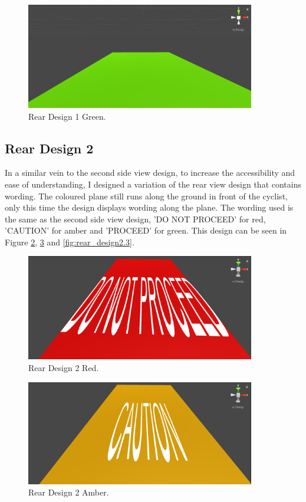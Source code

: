 \documentclass{l4proj}
\begin{document}
\begin{figure}[H]
    \centering
    \includegraphics[width=10cm]{images/rear_design1.3.png}
    \caption{Rear Design 1 Green.}
    \label{fig:rear_design1.3}
\end{figure}

\subsection{Rear Design 2}

In a similar vein to the second side view design, to increase the accessibility and ease of understanding, I designed a variation of the rear view design that contains wording. The coloured plane still runs along the ground in front of the cyclist, only this time the design displays wording along the plane. The wording used is the same as the second side view design, 'DO NOT PROCEED' for red, 'CAUTION' for amber and 'PROCEED' for green. This design can be seen in Figure \ref{fig:rear_design2.1}, \ref{fig:rear_design2.2} and \ref{fig:rear_design2.3}.

\begin{figure}[H]
    \centering
    \includegraphics[width=10cm]{images/rear_design2.1.png}
    \caption{Rear Design 2 Red.}
    \label{fig:rear_design2.1}
\end{figure}

\begin{figure}[H]
    \centering
    \includegraphics[width=10cm]{images/rear_design2.2.png}
    \caption{Rear Design 2 Amber.}
    \label{fig:rear_design2.2}
\end{figure}
\end{document}
